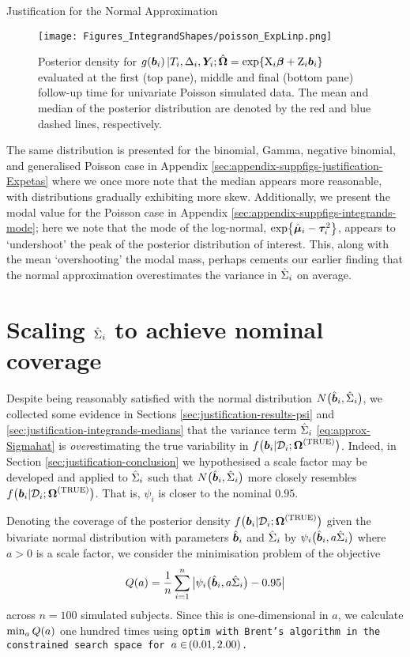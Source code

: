 \begin{chapter}{\label{cha:justification}Justification for the Normal Approximation}
  \begin{figure}[t]
      \centering
      \texttt{[image: Figures\_IntegrandShapes/poisson\_ExpLinp.png]}
      \caption{Posterior density for $g\!\left(\bm{b}_i\right)|T_i,\Delta_i,\bm{Y}_i;\hat{\bm{\Omega}}=\exp\!\left\{\mathrm{X}_i\bm{\beta}+\mathrm{Z}_i\bm{b}_i\right\}$ evaluated at the first (top pane), middle and final (bottom pane) follow-up time for univariate Poisson simulated data. The mean and median of the posterior distribution are denoted by the red and blue dashed lines, respectively.}
      \label{fig:justification-integrands-poisson-Expeta}
  \end{figure}

  The same distribution is presented for the binomial, Gamma, negative binomial, and generalised Poisson case in Appendix \ref{sec:appendix-suppfigs-justification-Expetas} where we once more note that the median appears more reasonable, with distributions gradually exhibiting more skew. Additionally, we present the modal value for the Poisson case in Appendix \ref{sec:appendix-suppfigs-integrands-mode}; here we note that the mode of the log-normal, $\exp\!\left\{\hat{\bm{\mu}}_i-\bm{\tau}_i^2\right\}$, appears to `undershoot' the peak of the posterior distribution of interest. This, along with the mean `overshooting' the modal mass, perhaps cements our earlier finding that the normal approximation overestimates the variance in $\hat{\Sigma}_i$ on average.

  \section{Scaling \texorpdfstring{$\hat{\Sigma}_i$}{hs} to achieve nominal coverage}\label{sec:justification-scale-factor}
  Despite being reasonably satisfied with the normal distribution $N\big(\hat{\bm{b}}_i,\hat{\Sigma}_i\big)$, we collected some evidence in Sections \ref{sec:justification-results-psi} and \ref{sec:justification-integrands-medians} that the variance term $\hat{\Sigma}_i$ \eqref{eq:approx-Sigmahat} is \textit{over}estimating the true variability in $f\big(\bm{b}_i|\mathcal{D}_i;\bm{\mathrm{\Omega}}^{(\mathrm{TRUE})}\big)$. Indeed, in Section \ref{sec:justification-conclusion} we hypothesised a scale factor may be developed and applied to $\hat{\Sigma}_i$ such that $N\big(\hat{\bm{b}}_i,\hat{\Sigma}_i\big)$ more closely resembles $f\big(\bm{b}_i|\mathcal{D}_i;\bm{\mathrm{\Omega}}^{(\mathrm{TRUE})}\big)$. That is, $\psi_i$ is closer to the nominal $0.95$.

  Denoting the coverage of the posterior density $f\big(\bm{b}_i|\mathcal{D}_i;\bm{\mathrm{\Omega}}^{(\mathrm{TRUE})}\big)$ given the bivariate normal distribution with parameters $\hat{\bm{b}}_i$ and $\hat{\Sigma}_i$ by $\psi_i\big(\hat{\bm{b}}_i,a\hat{\Sigma}_i\big)$ where $a>0$ is a scale factor, we consider the minimisation problem of the objective
  \begin{align}
      Q\!\left( a\right)=\frac{1}{n}\sum_{i=1}^n\big|\psi_i\big(\hat{\bm{b}}_i,a\hat{\Sigma}_i\big)-0.95\big|
  \label{eq:justification-minimisation-problem}
  \end{align}
  across $n=100$ simulated subjects. Since this is one-dimensional in $a$, we calculate $\min_aQ\!\left( a\right)$ one hundred times using \tt{optim} with Brent's algorithm in the constrained search space for $a\in\!\left(0.01,2.00\right)$.


\end{chapter}
